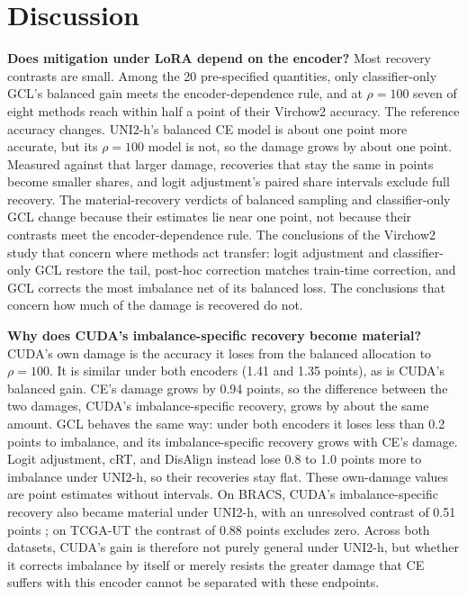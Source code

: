 \section{Discussion}
\label{sec:discussion}
\textbf{Does mitigation under LoRA depend on the encoder?} Most recovery contrasts are small. Among the 20 pre-specified quantities, only classifier-only GCL's balanced gain meets the encoder-dependence rule, and at $\rho=100$ seven of eight methods reach within half a point of their Virchow2 accuracy. The reference accuracy changes. UNI2-h's balanced CE model is about one point more accurate, but its $\rho=100$ model is not, so the damage grows by about one point. Measured against that larger damage, recoveries that stay the same in points become smaller shares, and logit adjustment's paired share intervals exclude full recovery. The material-recovery verdicts of balanced sampling and classifier-only GCL change because their estimates lie near one point, not because their contrasts meet the encoder-dependence rule. The conclusions of the Virchow2 study \citep{queisler2026mitigationTcga} that concern where methods act transfer: logit adjustment and classifier-only GCL restore the tail, post-hoc correction matches train-time correction, and GCL corrects the most imbalance net of its balanced loss. The conclusions that concern how much of the damage is recovered do not.

\textbf{Why does CUDA's imbalance-specific recovery become material?} CUDA's own damage is the accuracy it loses from the balanced allocation to $\rho=100$. It is similar under both encoders (1.41 and 1.35 points), as is CUDA's balanced gain. CE's damage grows by 0.94 points, so the difference between the two damages, CUDA's imbalance-specific recovery, grows by about the same amount. GCL behaves the same way: under both encoders it loses less than 0.2 points to imbalance, and its imbalance-specific recovery grows with CE's damage. Logit adjustment, cRT, and DisAlign instead lose 0.8 to 1.0 points more to imbalance under UNI2-h, so their recoveries stay flat. These own-damage values are point estimates without intervals. On BRACS, CUDA's imbalance-specific recovery also became material under UNI2-h, with an unresolved contrast of 0.51 points \citep{queisler2026mitigationUni2h}; on TCGA-UT the contrast of 0.88 points excludes zero. Across both datasets, CUDA's gain is therefore not purely general under UNI2-h, but whether it corrects imbalance by itself or merely resists the greater damage that CE suffers with this encoder cannot be separated with these endpoints.

